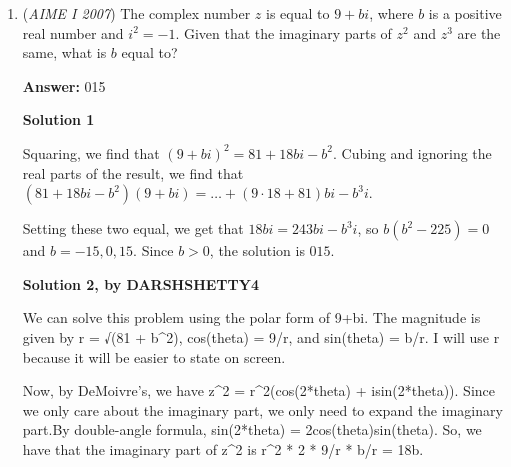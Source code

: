 \begin{enumerate}
\textbf{Solution}

Clearly we have people \textit{moving} at speeds of $6,8$ and $10$ feet/second. Notice that out of the three people, Cy is at the largest disadvantage to begin with and since all speeds are close, it is hardest for him to catch up. Furthermore, Bob is clearly the farthest along. Thus it is reasonable to assume that there is some point when Al is halfway between Cy and Bob. At this time $s$, we have that

 $\frac{8(s-4)+10(s-2)}{2}=6s$After solving, $s=\frac{26}{3}$. At this time, Al has traveled $6\cdot\frac{26}{3}=52$ feet.

 We could easily check that Al is in the middle by trying all three possible cases. $\frac{6s + 8(s-4)}{2} = 10(s-2)$ yields that $s = \frac 43$, which can be disregarded since both Bob and Cy hadn't started yet. $\frac{6s + 10(s-2)}{2} = 8(s-4)$ yields that $-10=-32$, a contradiction. Thus, the answer is $\boxed{052}$.

 


	\item (\textit{AIME I 2007}) The complex number $z$ is equal to $9+bi$, where $b$ is a positive real number and $i^{2}=-1$.  Given that the imaginary parts of $z^{2}$ and $z^{3}$ are the same, what is $b$ equal to?


 
 \textbf{Answer: }015



\textbf{Solution 1}

Squaring, we find that $(9 + bi)^2 = 81 + 18bi - b^2$. Cubing and ignoring the real parts of the result, we find that $(81 + 18bi - b^2)(9 + bi) = \ldots + (9\cdot 18 + 81)bi - b^3i$.

 Setting these two equal, we get that $18bi = 243bi - b^3i$, so $b(b^2 - 225) = 0$ and $b = -15, 0, 15$. Since $b > 0$, the solution is $\boxed{015}$.

 



\textbf{Solution 2, by DARSHSHETTY4}

We can solve this problem using the polar form of 9+bi. The magnitude is given by r = √(81 + b\textasciicircum{}2), cos(theta) = 9/r, and sin(theta) = b/r. I will use r because it will be easier to state on screen.

 Now, by DeMoivre's, we have z\textasciicircum{}2 = r\textasciicircum{}2(cos(2*theta) + isin(2*theta)). Since we only care about the imaginary part, we only need to expand the imaginary part.By double-angle formula, sin(2*theta) = 2cos(theta)sin(theta). So, we have that the imaginary part of z\textasciicircum{}2 is r\textasciicircum{}2 * 2 * 9/r * b/r = 18b.


\end{enumerate}

